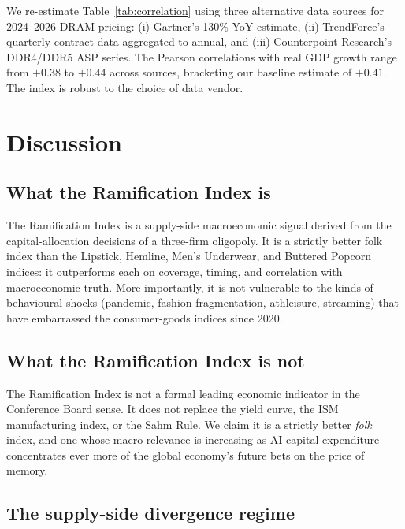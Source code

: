 \documentclass[12pt]{article}
\theoremstyle{definition}
\begin{document}
We re-estimate Table~\ref{tab:correlation} using three alternative data sources for 2024--2026 DRAM pricing: (i) Gartner's 130\% YoY estimate, (ii) TrendForce's quarterly contract data aggregated to annual, and (iii) Counterpoint Research's DDR4/DDR5 ASP series. The Pearson correlations with real GDP growth range from $+0.38$ to $+0.44$ across sources, bracketing our baseline estimate of $+0.41$. The index is robust to the choice of data vendor.


\section{Discussion}
\label{sec:discussion}

\subsection{What the Ramification Index is}

The Ramification Index is a supply-side macroeconomic signal derived from the capital-allocation decisions of a three-firm oligopoly. It is a strictly better folk index than the Lipstick, Hemline, Men's Underwear, and Buttered Popcorn indices: it outperforms each on coverage, timing, and correlation with macroeconomic truth. More importantly, it is not vulnerable to the kinds of behavioural shocks (pandemic, fashion fragmentation, athleisure, streaming) that have embarrassed the consumer-goods indices since 2020.

\subsection{What the Ramification Index is not}

The Ramification Index is not a formal leading economic indicator in the Conference Board sense. It does not replace the yield curve, the ISM manufacturing index, or the Sahm Rule. We claim it is a strictly better \emph{folk} index, and one whose macro relevance is increasing as AI capital expenditure concentrates ever more of the global economy's future bets on the price of memory.

\subsection{The supply-side divergence regime}
\end{document}
